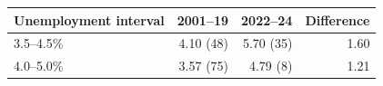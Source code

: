 \begin{tabular}{lrrr}
\toprule
Unemployment interval & 2001--19 & 2022--24 & Difference \\
\midrule
3.5--4.5\% & 4.10 (48) & 5.70 (35) & 1.60 \\
4.0--5.0\% & 3.57 (75) & 4.79 (8) & 1.21 \\
\bottomrule
\end{tabular}
